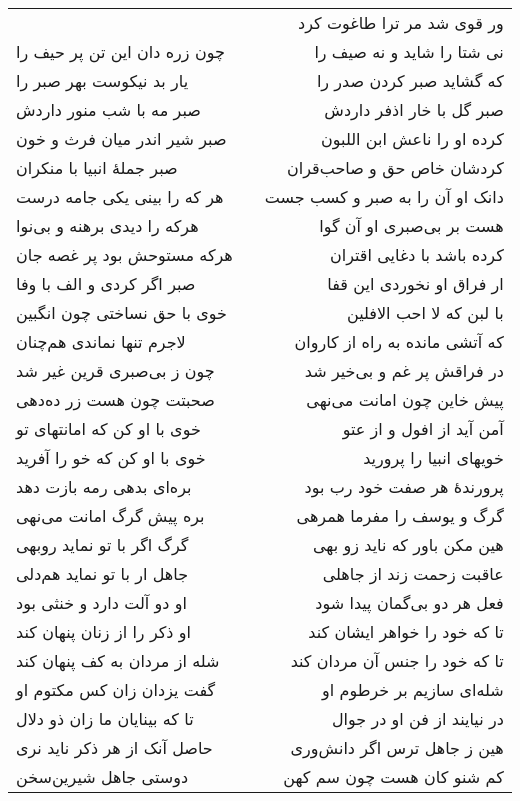 \begin{center}
\begin{longtable}{l p{0.5cm} r}
&&
ور قوی شد مر ترا طاغوت کرد
\\
چون زره دان این تن پر حیف را
&&
نی شتا را شاید و نه صیف را
\\
یار بد نیکوست بهر صبر را
&&
که گشاید صبر کردن صدر را
\\
صبر مه با شب منور داردش
&&
صبر گل با خار اذفر داردش
\\
صبر شیر اندر میان فرث و خون
&&
کرده او را ناعش ابن اللبون
\\
صبر جملهٔ انبیا با منکران
&&
کردشان خاص حق و صاحب‌قران
\\
هر که را بینی یکی جامه درست
&&
دانک او آن را به صبر و کسب جست
\\
هرکه را دیدی برهنه و بی‌نوا
&&
هست بر بی‌صبری او آن گوا
\\
هرکه مستوحش بود پر غصه جان
&&
کرده باشد با دغایی اقتران
\\
صبر اگر کردی و الف با وفا
&&
ار فراق او نخوردی این قفا
\\
خوی با حق نساختی چون انگبین
&&
با لبن که لا احب الافلین
\\
لاجرم تنها نماندی هم‌چنان
&&
که آتشی مانده به راه از کاروان
\\
چون ز بی‌صبری قرین غیر شد
&&
در فراقش پر غم و بی‌خیر شد
\\
صحبتت چون هست زر ده‌دهی
&&
پیش خاین چون امانت می‌نهی
\\
خوی با او کن که امانتهای تو
&&
آمن آید از افول و از عتو
\\
خوی با او کن که خو را آفرید
&&
خویهای انبیا را پرورید
\\
بره‌ای بدهی رمه بازت دهد
&&
پرورندهٔ هر صفت خود رب بود
\\
بره پیش گرگ امانت می‌نهی
&&
گرگ و یوسف را مفرما همرهی
\\
گرگ اگر با تو نماید روبهی
&&
هین مکن باور که ناید زو بهی
\\
جاهل ار با تو نماید هم‌دلی
&&
عاقبت زحمت زند از جاهلی
\\
او دو آلت دارد و خنثی بود
&&
فعل هر دو بی‌گمان پیدا شود
\\
او ذکر را از زنان پنهان کند
&&
تا که خود را خواهر ایشان کند
\\
شله از مردان به کف پنهان کند
&&
تا که خود را جنس آن مردان کند
\\
گفت یزدان زان کس مکتوم او
&&
شله‌ای سازیم بر خرطوم او
\\
تا که بینایان ما زان ذو دلال
&&
در نیایند از فن او در جوال
\\
حاصل آنک از هر ذکر ناید نری
&&
هین ز جاهل ترس اگر دانش‌وری
\\
دوستی جاهل شیرین‌سخن
&&
کم شنو کان هست چون سم کهن

\end{longtable}
\end{center}

